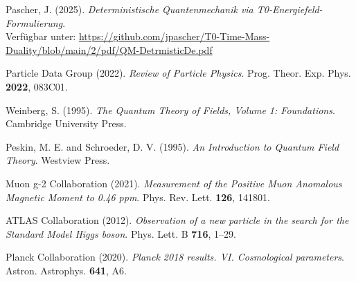 \documentclass[12pt,a4paper]{article}
\begin{document}
\begin{thebibliography}{99}
		Pascher, J. (2025). \textit{Deterministische Quantenmechanik via T0-Energiefeld-Formulierung}. \\
		Verfügbar unter: \url{https://github.com/jpascher/T0-Time-Mass-Duality/blob/main/2/pdf/QM-DetrmisticDe.pdf}
		
		Particle Data Group (2022). \textit{Review of Particle Physics}. Prog. Theor. Exp. Phys. \textbf{2022}, 083C01.
		
		Weinberg, S. (1995). \textit{The Quantum Theory of Fields, Volume 1: Foundations}. Cambridge University Press.
		
		Peskin, M. E. and Schroeder, D. V. (1995). \textit{An Introduction to Quantum Field Theory}. Westview Press.
		
		Muon g-2 Collaboration (2021). \textit{Measurement of the Positive Muon Anomalous Magnetic Moment to 0.46 ppm}. Phys. Rev. Lett. \textbf{126}, 141801.
		
		ATLAS Collaboration (2012). \textit{Observation of a new particle in the search for the Standard Model Higgs boson}. Phys. Lett. B \textbf{716}, 1--29.
		
		Planck Collaboration (2020). \textit{Planck 2018 results. VI. Cosmological parameters}. Astron. Astrophys. \textbf{641}, A6.
	\end{thebibliography}
	
\end{document}
